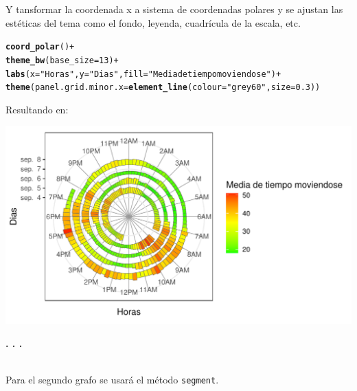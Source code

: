 \documentclass{article}\usepackage[]{graphicx}\usepackage[]{color}
\makeatletter
\def\maxwidth{ %
  \ifdim\Gin@nat@width>\linewidth
    \linewidth
  \else
    \Gin@nat@width
  \fi
}
\newcommand{\hlnum}[1]{\textcolor[rgb]{0.686,0.059,0.569}{#1}}%
\newcommand{\hlstr}[1]{\textcolor[rgb]{0.192,0.494,0.8}{#1}}%
\newcommand{\hlopt}[1]{\textcolor[rgb]{0,0,0}{#1}}%
\newcommand{\hlstd}[1]{\textcolor[rgb]{0.345,0.345,0.345}{#1}}%
\newcommand{\hlkwc}[1]{\textcolor[rgb]{0.333,0.667,0.333}{#1}}%
\newcommand{\hlkwd}[1]{\textcolor[rgb]{0.737,0.353,0.396}{\textbf{#1}}}%
\newenvironment{kframe}{%
 \def\at@end@of@kframe{}%
 \ifinner\ifhmode%
  \def\at@end@of@kframe{\end{minipage}}%
  \begin{minipage}{\columnwidth}%
 \fi\fi%
 \def\FrameCommand##1{\hskip\@totalleftmargin \hskip-\fboxsep
 \colorbox{shadecolor}{##1}\hskip-\fboxsep
     \hskip-\linewidth \hskip-\@totalleftmargin \hskip\columnwidth}%
 \MakeFramed {\advance\hsize-\width
   \@totalleftmargin\z@ \linewidth\hsize
   \@setminipage}}%
 {\par\unskip\endMakeFramed%
 \at@end@of@kframe}
\newenvironment{knitrout}{}{} %
\makeatother
\begin{document}
Y tansformar la coordenada x a sistema de coordenadas polares y se ajustan las est\'eticas del tema como el fondo, leyenda, cuadr\'icula de la escala, etc.
\begin{knitrout}
\color{fgcolor}\begin{kframe}
\begin{alltt}
  \hlkwd{coord_polar}\hlstd{()} \hlopt{+}
  \hlkwd{theme_bw}\hlstd{(}\hlkwc{base_size}\hlstd{=}\hlnum{13}\hlstd{)} \hlopt{+}
  \hlkwd{labs}\hlstd{(}\hlkwc{x}\hlstd{=}\hlstr{"Horas"}\hlstd{,}\hlkwc{y}\hlstd{=}\hlstr{"Dias"}\hlstd{,}\hlkwc{fill}\hlstd{=}\hlstr{"Media de tiempo moviendose"}\hlstd{)} \hlopt{+}
  \hlkwd{theme}\hlstd{(}\hlkwc{panel.grid.minor.x}\hlstd{=}\hlkwd{element_line}\hlstd{(}\hlkwc{colour}\hlstd{=}\hlstr{"grey60"}\hlstd{,} \hlkwc{size}\hlstd{=}\hlnum{0.3}\hlstd{))}
\end{alltt}
\end{kframe}
\end{knitrout}
\clearpage
Resultando en:
\begin{knitrout}
\color{fgcolor}

{\centering \includegraphics[width=\maxwidth]{figure/plot_rect-1} 

}



\end{knitrout}
\begin{center}
\textbf{. . .}
\end{center}
~\\
Para el segundo grafo se usar\'a el m\'etodo \texttt{segment}.
\end{document}
